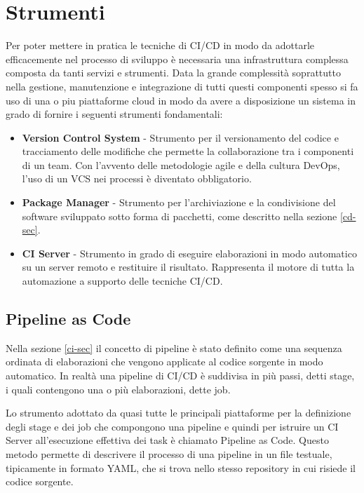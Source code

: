 \section{Strumenti}
\label{devops-tools-sec}
Per poter mettere in pratica le tecniche di CI/CD in modo da adottarle efficacemente nel processo di sviluppo è necessaria una infrastruttura complessa composta da tanti servizi e strumenti. Data la grande complessità soprattutto nella gestione, manutenzione e integrazione di tutti questi componenti spesso si fa uso di una o piu piattaforme cloud in modo da avere a disposizione un sistema in grado di fornire i seguenti strumenti fondamentali:
\begin{itemize}
    \item \textbf{Version Control System} - Strumento per il versionamento del codice e tracciamento delle modifiche che permette la collaborazione tra i componenti di un team. Con l'avvento delle metodologie agile e della cultura DevOps, l'uso di un VCS nei processi è diventato obbligatorio.
    \item \textbf{Package Manager} - Strumento per l'archiviazione e la condivisione del software sviluppato sotto forma di pacchetti, come descritto nella sezione \ref{cd-sec}.
    \item \textbf{CI Server} - Strumento in grado di eseguire elaborazioni in modo automatico su un server remoto e restituire il risultato. Rappresenta il motore di tutta la automazione a supporto delle tecniche CI/CD.
\end{itemize}

\subsection{Pipeline as Code}
Nella sezione \ref{ci-sec} il concetto di pipeline è stato definito come una sequenza ordinata di elaborazioni che vengono applicate al codice sorgente in modo automatico. In realtà una pipeline di CI/CD è suddivisa in più passi, detti stage, i quali contengono una o più elaborazioni, dette job.

Lo strumento adottato da quasi tutte le principali piattaforme per la definizione degli stage e dei job che compongono una pipeline e quindi per istruire un CI Server all'esecuzione effettiva dei task è chiamato Pipeline as Code. Questo metodo permette di descrivere il processo di una pipeline in un file testuale, tipicamente in formato YAML, che si trova nello stesso repository in cui risiede il codice sorgente.

